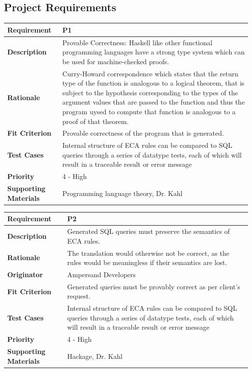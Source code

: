 \documentclass[12pt]{report}
\begin{document}
\subsection{Project Requirements}
{\setlength{\tabcolsep}{6pt} %
    \begin{tabularx}{\textwidth}{>{\bfseries}C{3cm}X}
        Requirement & P1 \\ 
        \midrule
        \endhead
        Description  & Provable Correctness: Haskell like other functional 
        programming languages have 
        a strong type system which can be used for machine-checked proofs.
        \\	Rationale & Curry-Howard correspondence which states that the 
        return type of the function is analogous to a logical theorem, that is 
        subject to the hypothesis corresponding to the types of the argument 
        values that are passed to the function and thus the program uysed to 
        compute that function is analogous to a proof of that theorem.
        \\	Fit Criterion & Provable correctness of the program that is 
        generated.
        \\ Test Cases & Internal structure of ECA rules can be compared to SQL 
        queries through a series of datatype tests, each of which will result 
        in a traceable result or error message
        \\	Priority & 4 - High
        \\	Supporting Materials & Programming language theory, Dr. Kahl
        \vspace{12pt}
    \end{tabularx}
}
{\setlength{\tabcolsep}{6pt} %
    \begin{tabularx}{\textwidth}{>{\bfseries}C{3cm}X}
        Requirement & P2 \\ 
        \midrule
        \endhead
        Description  & Generated SQL queries must preserve the semantics of ECA 
        rules.  
        \\	Rationale & The translation would otherwise not be correct, as the 
        rules would be meaningless if their semantics are lost.
        \\	Originator & Ampersand Developers
        \\	Fit Criterion & Generated queries must be provably correct as per 
        client's request.
        \\ Test Cases & Internal structure of ECA rules can be compared to SQL 
        queries through a series of datatype tests, each of which will result 
        in a traceable result or error message
        \\	Priority & 4 - High
        \\	Supporting Materials & Hackage, Dr. Kahl
        \vspace{12pt}
    \end{tabularx}
}
\end{document}

